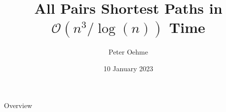 

\author{Peter Oehme}
\title{All Pairs Shortest Paths in \texorpdfstring{$\mathcal{O}(n^3 / \log(n))$}{O (n \^{} 3 / log (n))} Time}
\date{10 January 2023}




\begin{frame}
    \maketitle
\end{frame}

\begin{frame}{Overview}
    \tableofcontents
\end{frame}







